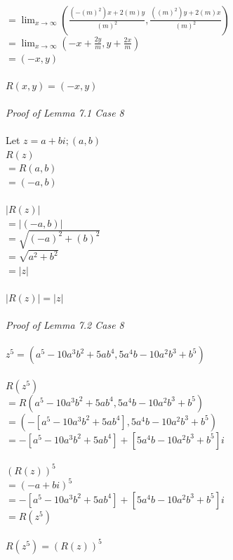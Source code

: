 \documentclass{article}
\begin{document}
\\$= \lim_{x \to \infty} (\frac{(-(m)^2)x+2(m)y}{(m)^2}, \frac{((m)^2)y+2(m)x}{(m)^2})$
\\$= \lim_{x \to \infty} (-x+\frac{2y}{m}, y+\frac{2x}{m})$
\\$= (-x,y)$
\\
\\$R(x,y) = (-x, y)$
\\
\\\textit{Proof of Lemma 7.1 Case 8}
\\
\\Let $z=a+bi; (a,b)$
\\$R(z)$
\\$= R(a,b)$
\\$= (-a, b)$
\\
\\$|R(z)|$
\\$=|(-a,b)| $
\\$= \sqrt{(-a)^2 + (b)^2}$
\\$= \sqrt{a^2 + b^2}$
\\$= |z|$
\\
\\$|R(z)| = |z|$
\\
\\\textit{Proof of Lemma 7.2 Case 8}
\\
\\$z^5 = (a^5-10a^3b^2+5ab^4, 5a^4b-10a^2b^3+b^5)$
\\
\\$R(z^5)$
\\$= R(a^5-10a^3b^2+5ab^4, 5a^4b-10a^2b^3+b^5)$
\\$= (-[a^5-10a^3b^2+5ab^4], 5a^4b-10a^2b^3+b^5)$
\\$= -[a^5-10a^3b^2+5ab^4] + [5a^4b-10a^2b^3+b^5]i$
\\
\\$(R(z))^5$
\\$= (-a+bi)^5$
\\$= -[a^5-10a^3b^2+5ab^4] + [5a^4b-10a^2b^3+b^5]i$
\\$= R(z^5)$
\\
\\$R(z^5) = (R(z))^5$
\\
\\
\\
\\
\end{document}
